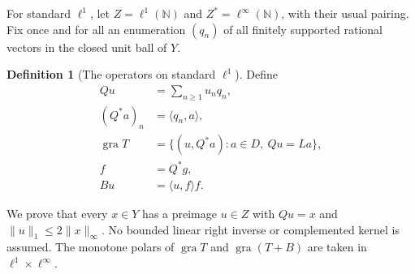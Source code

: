 \documentclass[11pt]{article}
\newcommand{\N}{\mathbb N}
\newcommand{\gra}{\operatorname{gra}}
\newcommand{\pair}[2]{\langle #1,#2\rangle}
\theoremstyle{definition}
\newtheorem{definition}{Definition}
\theoremstyle{remark}
\begin{document}
For standard $\ell^1$, let $Z=\ell^1(\N)$ and $Z^*=\ell^\infty(\N)$,
with their usual pairing. Fix once and for all an enumeration $(q_n)$ of
all finitely supported rational vectors in the closed unit ball of $Y$.
\begin{definition}[The operators on standard $\ell^1$]
Define
\begin{equation}
\begin{aligned}
Qu&=\sum_{n\ge1}u_nq_n,\\
(Q^*a)_n&=\pair{q_n}{a},\\
\gra T&=\{(u,Q^*a):a\in D,\ Qu=La\},\\
f&=Q^*g,\\
Bu&=\pair{u}{f}f.
\end{aligned}
\label{eq:D10}
\end{equation}
\end{definition}
We prove that every $x\in Y$ has a preimage $u\in Z$ with
$Qu=x$ and $\|u\|_1\le2\|x\|_\infty$. No bounded linear
right inverse or complemented kernel is assumed. The monotone polars of $\gra T$ and $\gra(T+B)$ are taken in
$\ell^1\times\ell^\infty$.
\end{document}
